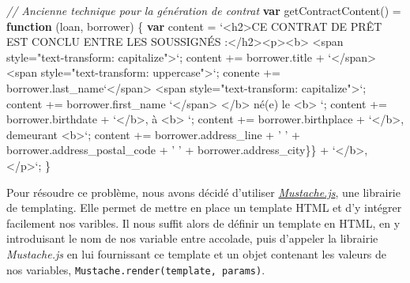\documentclass[12pt,a4paper]{article}
\newenvironment{Shaded}{}{}
\newcommand{\KeywordTok}[1]{\textcolor[rgb]{0.00,0.44,0.13}{\textbf{{#1}}}}
\newcommand{\StringTok}[1]{\textcolor[rgb]{0.25,0.44,0.63}{{#1}}}
\newcommand{\VerbatimStringTok}[1]{\textcolor[rgb]{0.25,0.44,0.63}{{#1}}}
\newcommand{\CommentTok}[1]{\textcolor[rgb]{0.38,0.63,0.69}{\textit{{#1}}}}
\newcommand{\VariableTok}[1]{\textcolor[rgb]{0.10,0.09,0.49}{{#1}}}
\newcommand{\OperatorTok}[1]{\textcolor[rgb]{0.40,0.40,0.40}{{#1}}}
\newcommand{\AttributeTok}[1]{\textcolor[rgb]{0.49,0.56,0.16}{{#1}}}
\newcommand{\NormalTok}[1]{{#1}}
\begin{document}
  \begin{Shaded}
  \begin{Highlighting}[]
  \CommentTok{// Ancienne technique pour la génération de contrat}
  \KeywordTok{var} \AttributeTok{getContractContent}\NormalTok{() }\OperatorTok{=} \KeywordTok{function} \NormalTok{(loan}\OperatorTok{,} \NormalTok{borrower) }\OperatorTok{\{}
    \KeywordTok{var} \NormalTok{content }\OperatorTok{=} \VerbatimStringTok{`<h2>CE CONTRAT DE PRÊT EST CONCLU}
  \VerbatimStringTok{    ENTRE LES SOUSSIGNÉS :</h2><p><b>}
  \VerbatimStringTok{    <span style="text-transform: capitalize">`}\OperatorTok{;}
    \NormalTok{content }\OperatorTok{+=} \VariableTok{borrower}\NormalTok{.}\AttributeTok{title} \OperatorTok{+} \VerbatimStringTok{`</span>}
  \VerbatimStringTok{   <span style="text-transform: uppercase">`}\OperatorTok{;}
    \NormalTok{conente }\OperatorTok{+=} \VariableTok{borrower}\NormalTok{.}\AttributeTok{last_name}\VerbatimStringTok{`</span>}
  \VerbatimStringTok{   <span style="text-transform: capitalize">`}\OperatorTok{;}
    \NormalTok{content }\OperatorTok{+=} \VariableTok{borrower}\NormalTok{.}\AttributeTok{first_name} \VerbatimStringTok{`</span>}
  \VerbatimStringTok{    </b> né(e) le <b> `}\OperatorTok{;}
    \NormalTok{content }\OperatorTok{+=} \VariableTok{borrower}\NormalTok{.}\AttributeTok{birthdate} \OperatorTok{+} \VerbatimStringTok{`</b>, à <b> `}\OperatorTok{;}
    \NormalTok{content }\OperatorTok{+=} \VariableTok{borrower}\NormalTok{.}\AttributeTok{birthplace} \OperatorTok{+} \VerbatimStringTok{`</b>, demeurant <b>`}\OperatorTok{;}
    \NormalTok{content }\OperatorTok{+=} \VariableTok{borrower}\NormalTok{.}\AttributeTok{address_line} \OperatorTok{+} \StringTok{' '}
      \OperatorTok{+} \VariableTok{borrower}\NormalTok{.}\AttributeTok{address_postal_code} \OperatorTok{+} \StringTok{' '}
      \OperatorTok{+}  \VariableTok{borrower}\NormalTok{.}\AttributeTok{address_city}\OperatorTok{\}}\NormalTok{\} }\OperatorTok{+} \VerbatimStringTok{`</b>, </p>`}\OperatorTok{;}
  \NormalTok{\}}
  \end{Highlighting}
  \end{Shaded}

  \bigskip

  Pour résoudre ce problème, nous avons décidé d'utiliser
  \href{https://github.com/janl/mustache.js}{\emph{Mustache.js}}, une
  librairie de templating. Elle permet de mettre en place un template HTML
  et d'y intégrer facilement nos varibles. Il nous suffit alors de définir
  un template en HTML, en y introduisant le nom de nos variable entre
  accolade, puis d'appeler la librairie \emph{Mustache.js} en lui
  fournissant ce template et un objet contenant les valeurs de nos
  variables, \texttt{Mustache.render(template,\ params)}.
\end{document}
